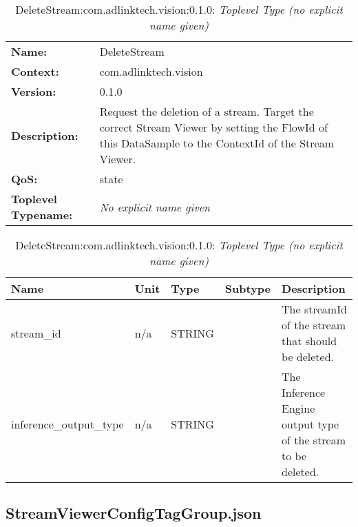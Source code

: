 \begin{table}[H]
\begin{tabularx}{\textwidth}{l X} 
       \textbf{Name:} & DeleteStream \\ 
	   \textbf{Context:} & com.adlinktech.vision \\ 
	   \textbf{Version:} & 0.1.0 \\ 
	   \textbf{Description:} & Request the deletion of a stream. Target the correct Stream Viewer by setting the FlowId of this DataSample to the ContextId of the Stream Viewer. \\ 
	   \textbf{QoS:} & state \\
	   \textbf{Toplevel Typename:} & \textit{No explicit name given} \\ 
\end{tabularx}
\caption{DeleteStream:com.adlinktech.vision:0.1.0}\label{DeleteStreamTagGroup.json:table:DeleteStream}
\bigskip
\begin{tabularx}{\textwidth}{l l l l X} 
	 \textbf{Name} & \textbf{Unit} & \textbf{Type} & \textbf{Subtype} & \textbf{Description} \\
	 \midrule
   stream\_id & n/a & STRING &  & The streamId of the stream that should be deleted. \\
   inference\_output\_type & n/a & STRING &  & The Inference Engine output type of the stream to be deleted. \\
\end{tabularx}
\caption{DeleteStream:com.adlinktech.vision:0.1.0: \textit{Toplevel Type (no explicit name given)}}\label{DeleteStreamTagGroup.json:table:DeleteStream-no-type-given}


\end{table}

\subsection{StreamViewerConfigTagGroup.json}


